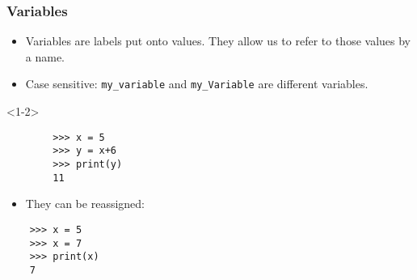 \documentclass[notes]{beamer}
\begin{document}
\begin{frame}[fragile]
    \frametitle{Variables}
    \begin{itemize}
        \item Variables are labels put onto values. They allow us to refer to those values by a name.
        \pause
        \item Case sensitive: \lstinline|my_variable| and \lstinline|my_Variable| are different variables.
    \end{itemize}
    \pause
    
    \begin{onlyenv}<1-2>
        \begin{lstlisting}
        >>> x = 5
        >>> y = x+6
        >>> print(y)
        11
        \end{lstlisting}
    \end{onlyenv}
    
    \pause
    
    \begin{itemize} \item They can be reassigned: \end{itemize}
    
    \begin{lstlisting}
    >>> x = 5
    >>> x = 7
    >>> print(x)
    7
    \end{lstlisting}
    
    \pause
    

\end{frame}
\end{document}
